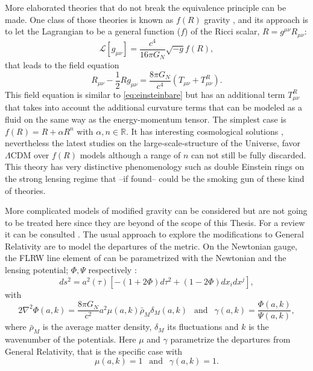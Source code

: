 More elaborated theories that do not break the equivalence principle can be made. One class of those theories is known as $f(R)$ gravity \cite{2010LRR....13....3D,2010RvMP...82..451S}, and its approach is to let the Lagrangian to be a general function ($f$)
of the Ricci scalar, $R=g^{\mu\nu}R_{\mu\nu}$:
\begin{equation}
\mathcal{L}[g_{\mu\nu}] = \frac{c^4}{16\pi G_N}\sqrt{-g}f(R),
\end{equation}
that leads to the field equation
\begin{equation}
R_{\mu\nu}-\frac{1}{2}Rg_{\mu\nu}=\frac{8\pi G_N}{c^4}( T_{\mu\nu}+T_{\mu\nu}^R).
\end{equation}
This field equation is similar to \autoref{eq:einsteinbare} but has an additional term $T_{\mu\nu}^R$ that takes into account the additional curvature terms that can be modeled as a fluid on the same way as the energy-momentum tensor. The simplest case is $f(R) =R+\alpha R^n$ with $\alpha,n\in\mathbb{R}$. It has interesting cosmological solutions \cite{PhysRevD.85.083511}, nevertheless the latest studies on the large-scale-structure of the Universe, favor $\Lambda$CDM over $f(R)$ models \cite{2013PhRvD..88d4050A} although a range of $n$ can not still be fully discarded. This theory has very distinctive phenomenology such as double Einstein rings on the strong lensing regime \cite{2011PhRvD..83b4030N} that --if found-- could be the smoking gun of these kind of theories.
\newline

More complicated models of modified gravity can be considered but are not going to be treated here since they are beyond of the scope of this Thesis. For a review it can be consulted \cite{2015CQGra..32x3001B}. The usual approach to explore the modifications to General Relativity \cite{2015PhRvD..91h3504L} are to model the departures of the metric. On the Newtonian gauge, the FLRW line element of can be parametrized with the Newtonian and the lensing potential; $\Phi,\Psi$ respectively \cite{2015PhRvD..91h3504L}:
\begin{equation}
ds^2 = a^2(\tau)[-(1+2\Phi)d\tau^2+(1-2\Phi)dx_idx^j],
\end{equation}
with
\begin{equation}
2\nabla^2\Phi(a,k) = \frac{8\pi G_N}{c^2}a^2\mu(a,k)\bar \rho_M\delta_M(a,k)\ \ \mbox{ and }\ \ \gamma(a,k)=\frac{\Phi(a,k)}{\Psi(a,k)},
\end{equation}
where $\bar \rho_M$ is the average matter density, $\delta_M$ its fluctuations and $k$ is the wavenumber of the potentials. Here $\mu$ and $\gamma$ parametrize the departures from General Relativity, that is the specific case with
\begin{equation}
\mu(a,k) = 1\ \ \mbox{ and }\ \ \gamma(a,k) = 1.
\end{equation}

